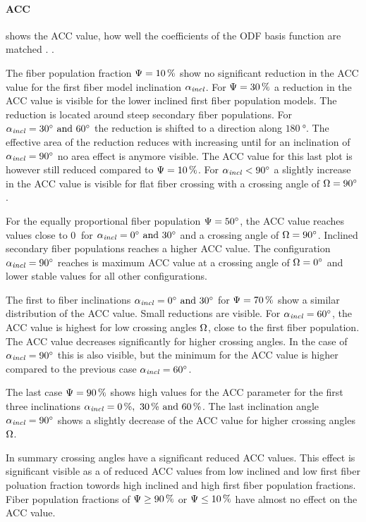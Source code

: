 \paragraph{\acs{ACC}}
 shows the  \ac{ACC} value, \ie{} how well the coefficients of the \ac{ODF} basis function are matched \cite{Schilling2018}.
.
\par
% 
The fiber population fraction $\textnormal{$\Psi$}=\SI{10}{\percent}$ show no significant reduction in the \ac{ACC} value for the first fiber model inclination $\textnormal{$\alpha_{\mathit{incl}}$}$.
For $\textnormal{$\Psi$}=\SI{30}{\percent}$ a reduction in the \ac{ACC} value is visible for the lower inclined first fiber population models.
The reduction is located around steep secondary fiber populations.
For $\modelInc = \SIlist{30;60}{\degree}$ the reduction is shifted to a direction along $\SI{180}{\degree}$.
The effective area of the reduction reduces with increasing \modelInc{} until for an inclination of $\textnormal{$\alpha_{\mathit{incl}}$}=\SI{90}{\degree}$ no area effect is anymore visible.
The \ac{ACC} value for this last plot is however still reduced compared to $\textnormal{$\Psi$}=\SI{10}{\percent}$.
For $\textnormal{$\alpha_{\mathit{incl}}$} < \SI{90}{\degree}$ a slightly increase in the \ac{ACC} value is visible for flat fiber crossing with a crossing angle of $\textnormal{$\Omega$}=\SI{90}{\degree}$.
\par
%
For the equally proportional fiber population $\textnormal{$\Psi$} = \SI{50}{\degree}$, the \ac{ACC} value reaches values close to $\SI{0}{}$ for $\modelInc = \SIlist{0;30}{\degree}$ and a crossing angle of $\textnormal{$\Omega$}=\SI{90}{\degree}$.
Inclined secondary fiber populations reaches a higher \ac{ACC} value.
The configuration $\textnormal{$\alpha_{\mathit{incl}}$} = \SI{90}{\degree}$ reaches is maximum \ac{ACC} value at a crossing angle of $\textnormal{$\Omega$}=\SI{0}{\degree}$ and lower stable values for all other configurations.
\par
%
The first to fiber inclinations $\modelInc = \SIlist{0;30}{\degree}$ for $\textnormal{$\Psi$}=\SI{70}{\percent}$ show a similar distribution of the \ac{ACC} value. 
Small reductions are visible.
For $\textnormal{$\alpha_{\mathit{incl}}$}=\SI{60}{\degree}$, the \ac{ACC} value is highest for low crossing angles $\textnormal{$\Omega$}$, \ie{} close to the first fiber population.
The \ac{ACC} value decreases significantly for higher crossing angles.
In the case of $\textnormal{$\alpha_{\mathit{incl}}$}=\SI{90}{\degree}$ this is also visible, but the minimum for the \ac{ACC} value is higher compared to the previous case $\textnormal{$\alpha_{\mathit{incl}}$}=\SI{60}{\degree}$.
\par
%
The last case $\textnormal{$\Psi$}=\SI{90}{\percent}$ shows high values for the \ac{ACC} parameter for the first three inclinations $\modelInc=\SIlist{0;30;60}{\percent}$.
The last inclination angle $\textnormal{$\alpha_{\mathit{incl}}$}=\SI{90}{\degree}$ shows a slightly decrease of the \ac{ACC} value for higher crossing angles $\textnormal{$\Omega$}$.
\par
%
In summary crossing angles have a significant reduced \ac{ACC} values.
This effect is significant visible as a  of reduced \ac{ACC} values from low inclined and low first fiber poluation fraction towords high inclined and high first fiber population fractions.
Fiber population fractions of $\textnormal{$\Psi$} \geq \SI{90}{\percent}$ or $\textnormal{$\Psi$} \leq \SI{10}{\percent}$ have almost no effect on the \ac{ACC} value.
%
%
% 
